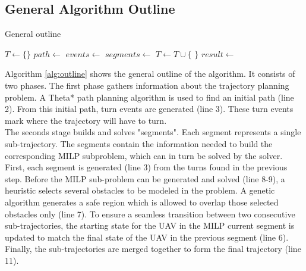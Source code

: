 
%

\subsection{General Algorithm Outline}
\begin{algorithm}
\caption{General outline}
\label{alg:outline}
\begin{algorithmic}[1]
\State $T \leftarrow \{\}$ 
\State $path \leftarrow$ 
\State $events \leftarrow$ 
\State $segments \leftarrow$ 
\State {}
\State {}
\State {}
\State $T \leftarrow T \cup \{$  $\}$
\EndFor
\State $result \leftarrow $
\end{algorithmic}
\end{algorithm}

Algorithm \ref{alg:outline} shows the general outline of the algorithm. It consists of two phases. The first phase gathers information about the trajectory planning problem. A Theta* path planning algorithm is used to find an initial path (line 2). From this initial path, turn events are generated (line 3). These turn events mark where the trajectory will have to turn. \\
The seconds stage builds and solves "segments". Each segment represents a single sub-trajectory. The segments contain the information needed to build the corresponding MILP subproblem, which can in turn be solved by the solver. First, each segment is generated (line 3) from the turns found in the previous step. Before the MILP sub-problem can be generated and solved (line 8-9), a heuristic selects several obstacles to be modeled in the problem. A genetic algorithm generates a safe region which is allowed to overlap those selected obstacles only (line 7). To ensure a seamless transition between two consecutive sub-trajectories, the starting state for the UAV in the MILP current segment is updated to match the final state of the UAV in the previous segment (line 6). Finally, the sub-trajectories are merged together to form the final trajectory (line 11).

